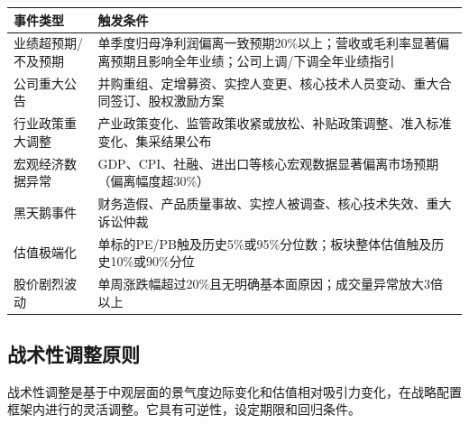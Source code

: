 \begin{exhibitbox}[表9-15：事件驱动调仓触发条件]
\scriptsize
\setlength{\tabcolsep}{3pt}
\renewcommand{\arraystretch}{1.12}
\begin{tabularx}{\textwidth}{l X}
\toprule
\textbf{事件类型} & \textbf{触发条件} \\
\midrule
业绩超预期/不及预期 & 单季度归母净利润偏离一致预期20\%以上；营收或毛利率显著偏离预期且影响全年业绩；公司上调/下调全年业绩指引 \\
公司重大公告 & 并购重组、定增募资、实控人变更、核心技术人员变动、重大合同签订、股权激励方案 \\
行业政策重大调整 & 产业政策变化、监管政策收紧或放松、补贴政策调整、准入标准变化、集采结果公布 \\
宏观经济数据异常 & GDP、CPI、社融、进出口等核心宏观数据显著偏离市场预期（偏离幅度超30\%） \\
黑天鹅事件 & 财务造假、产品质量事故、实控人被调查、核心技术失效、重大诉讼仲裁 \\
估值极端化 & 单标的PE/PB触及历史5\%或95\%分位数；板块整体估值触及历史10\%或90\%分位 \\
股价剧烈波动 & 单周涨跌幅超过20\%且无明确基本面原因；成交量异常放大3倍以上 \\
\bottomrule
\end{tabularx}
\end{exhibitbox}

\subsection{战术性调整原则}

战术性调整是基于中观层面的景气度边际变化和估值相对吸引力变化，在战略配置框架内进行的灵活调整。它具有可逆性，设定期限和回归条件。

